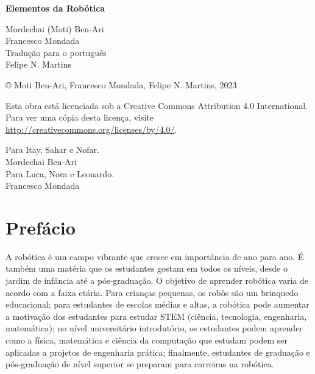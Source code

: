 
\begin{center}
\mbox{}

\vspace{6ex}

\textsf{\bfseries\huge Elementos da Robótica}

\vspace{16ex}

\textsf{\large Mordechai (Moti) Ben-Ari\\[4pt]Francesco Mondada\\[20pt]
Tradução para o português \\[4pt]
Felipe N. Martins}

\end{center}

\vfill

\begin{center}
\copyright{} Moti Ben-Ari, Francesco Mondada, Felipe N. Martins, $2023$
 \end{center}
 
\begin{small}
Esta obra está licenciada sob a Creative Commons Attribution 4.0 International. Para ver uma cópia desta licença, visite \url{http://creativecommons.org/licenses/by/4.0/}.
\end{small}


\newpage
\mbox{}
\vfill
\begin{flushright}
Para Itay, Sahar e Nofar.\\[4pt]
Mordechai Ben-Ari\\[18pt]

Para Luca, Nora e Leonardo.\\[4pt]
Francesco Mondada
\end{flushright}
\vfill
\mbox{}
\newpage

\chapter*{Prefácio}

A robótica é um campo vibrante que cresce em importância de ano para ano. É também uma matéria que os estudantes gostam em todos os níveis, desde o jardim de infância até a pós-graduação. O objetivo de aprender robótica varia de acordo com a faixa etária. Para crianças pequenas, os robôs são um brinquedo educacional; para estudantes de escolas médias e altas, a robótica pode aumentar a motivação dos estudantes para estudar STEM (ciência, tecnologia, engenharia, matemática); no nível universitário introdutório, os estudantes podem aprender como a física, matemática e ciência da computação que estudam podem ser aplicadas a projetos de engenharia prática; finalmente, estudantes de graduação e pós-graduação de nível superior se preparam para carreiras na robótica.

